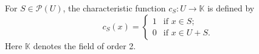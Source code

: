 For $S \in \mathcal{P}(U)$, the characteristic function $c_S: U \rightarrow \mathbb{K}$ is defined by
$$c_S(x) = \begin{cases} 1 & \text{if } x \in S; \\ 0 & \text{if } x \in U + S. \end{cases}$$
Here $\mathbb{K}$ denotes the field of order 2.
